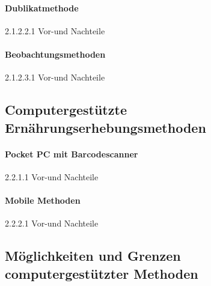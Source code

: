 \paragraph{Dublikatmethode}
2.1.2.2.1	Vor-und Nachteile

\paragraph{Beobachtungsmethoden}
2.1.2.3.1	Vor-und Nachteile


\subsection{Computergestützte Ernährungserhebungsmethoden}

\paragraph{Pocket PC mit Barcodescanner}
2.2.1.1	Vor-und Nachteile

\paragraph{Mobile Methoden}
2.2.2.1	Vor-und Nachteile

\subsection{Möglichkeiten und Grenzen computergestützter Methoden}

